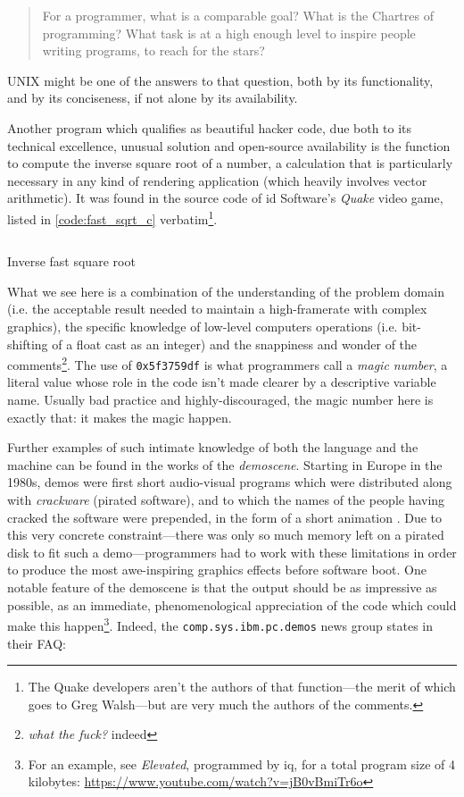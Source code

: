 \begin{quote}
  For a programmer, what is a comparable goal? What is the Chartres of programming? What task is at a high enough level to inspire people writing programs, to reach for the stars? \citep{gabriel_patterns_1998}
\end{quote}

UNIX might be one of the answers to that question, both by its functionality, and by its conciseness, if not alone by its availability.

Another program which qualifies as beautiful hacker code, due both to its technical excellence, unusual solution and open-source availability is the function to compute the inverse square root of a number, a calculation that is particularly necessary in any kind of rendering application (which heavily involves vector arithmetic). It was found in the source code of id Software's \emph{Quake} video game, listed in \ref{code:fast_sqrt_c} verbatim\footnote{The Quake developers aren't the authors of that function—the merit of which goes to Greg Walsh—but are very much the authors of the comments.}.

\pagebreak

\begin{listing}
  \inputminted{c}{./corpus/fast_inverse_sqrt.c}
  \caption{Inverse fast square root}
  \label{code:fast_sqrt_c}
\end{listing}

What we see here is a combination of the understanding of the problem domain (i.e. the acceptable result needed to maintain a high-framerate with complex graphics), the specific knowledge of low-level computers operations (i.e. bit-shifting of a float cast as an integer) and the snappiness and wonder of the comments\footnote{\emph{what the fuck?} indeed}. The use of \lstinline{0x5f3759df} is what programmers call a \emph{magic number}, a literal value whose role in the code isn't made clearer by a descriptive variable name. Usually bad practice and highly-discouraged, the magic number here is exactly that: it makes the magic happen.

Further examples of such intimate knowledge of both the language and the machine can be found in the works of the \emph{demoscene}. Starting in Europe in the 1980s, demos were first short audio-visual programs which were distributed along with \emph{crackware} (pirated software), and to which the names of the people having cracked the software were prepended, in the form of a short animation \citep{reunanen_computer_2010}. Due to this very concrete constraint—there was only so much memory left on a pirated disk to fit such a demo—programmers had to work with these limitations in order to produce the most awe-inspiring graphics effects before software boot. One notable feature of the demoscene is that the output should be as impressive as possible, as an immediate, phenomenological appreciation of the code which could make this happen\footnote{For an example, see \emph{Elevated}, programmed by iq, for a total program size of 4 kilobytes: \url{https://www.youtube.com/watch?v=jB0vBmiTr6o}}. Indeed, the \lstinline{comp.sys.ibm.pc.demos} news group states in their FAQ:

